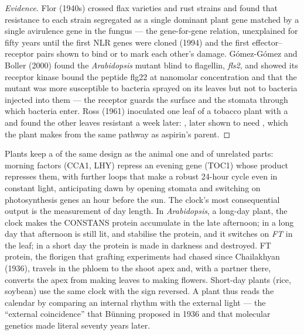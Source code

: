 \begin{proof}[Evidence]
Flor (1940s) crossed flax varieties and rust strains and found that
resistance to each strain segregated as a single dominant plant gene
matched by a single avirulence gene in the fungus --- the gene-for-gene
relation, unexplained for fifty years until the first NLR genes were
cloned (1994) and the first effector--receptor pairs shown to bind or to
mark each other's damage. Gómez-Gómez and Boller (2000) found the
\emph{Arabidopsis} mutant blind to flagellin, \emph{fls2}, and showed
its receptor kinase bound the peptide flg22 at nanomolar concentration
and that the mutant was more susceptible to bacteria sprayed on its
leaves but not to bacteria injected into them --- the receptor guards the
surface and the stomata through which bacteria enter. Ross (1961)
inoculated one leaf of a tobacco plant with a  and found the other
leaves resistant a week later: , later shown
to need , which the plant makes from the same pathway as
aspirin's parent.
\end{proof}

\begin{example}\label{ex:b3:plant-molecular-physiology:clock}
Plants keep a  of the same design as the animal one and
of unrelated parts: morning factors (CCA1, LHY) repress an evening gene
(TOC1) whose product represses them, with further loops that make a
robust 24-hour cycle even in constant light, anticipating dawn by
opening stomata and switching on photosynthesis genes an hour before
the sun. The clock's most consequential output is the measurement of
day length. In \emph{Arabidopsis}, a long-day plant, the clock makes the
CONSTANS protein accumulate in the late afternoon; in a long day that
afternoon is still lit,  and  stabilise the
protein, and it switches on \emph{FT} in the leaf; in a short day the
protein is made in darkness and destroyed. FT protein, the florigen
that grafting experiments had chased since Chailakhyan (1936), travels
in the phloem to the shoot apex and, with a partner there, converts the
apex from making leaves to making flowers. Short-day plants (rice,
soybean) use the same clock with the sign reversed. A plant thus reads
the calendar by comparing an internal rhythm with the external light ---
the ``external coincidence'' that Bünning proposed in 1936 and that
molecular genetics made literal seventy years later.
\end{example}

